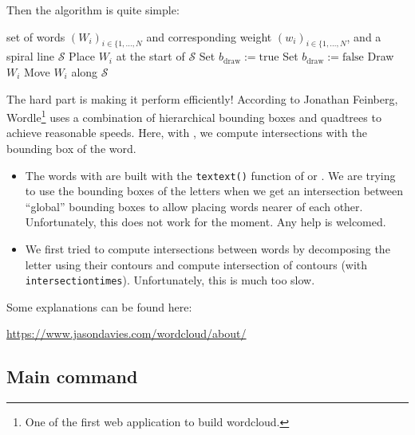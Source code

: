 \documentclass[english]{ltxdoc}
\begin{document}
Then the algorithm is quite simple:
\begin{algorithmic}[1]
\Require set of words $(W_i)_{i\in\{1,\dots,N}$ and corresponding weight
$(w_i)_{i\in\{1,\dots,N}$, and a spiral line $\mathcal{S}$
\State Place $W_i$ at the start of $\mathcal{S}$
\Repeat
  \State Set $b_\text{draw}:=\text{true}$
    \State Set $b_\text{draw}:=\text{false}$
    \EndIf
  \EndFor
    \State Draw $W_i$
  \Else
    \State Move $W_i$ along $\mathcal{S}$
  \EndIf
{}
\EndFor
\end{algorithmic}

The hard part is making it perform efficiently! According to Jonathan Feinberg,
Wordle\footnote{One of the first web application to build wordcloud.} uses a
combination of hierarchical bounding boxes and quadtrees to achieve reasonable
speeds. Here, with , we compute intersections with the bounding
box of the word. 

\begin{remark}
  \begin{itemize}
    \item 
  The words with  are built with the \lstinline+textext()+
  function of  or . We are trying to use the
  bounding boxes of the letters when we get an intersection between ``global''
  bounding boxes to allow placing words nearer of each other. Unfortunately,
  this does not work for the moment. Any help is welcomed. \medskip

  \item We first tried to compute intersections between words by decomposing the
  letter using their contours and compute intersection of contours (with
  \lstinline+intersectiontimes+). Unfortunately, this is much too slow. 
\end{itemize}
  
\end{remark}

Some explanations can be found here:
\begin{center}
  \url{https://www.jasondavies.com/wordcloud/about/}
\end{center}

\subsection{Main command}
\end{document}
